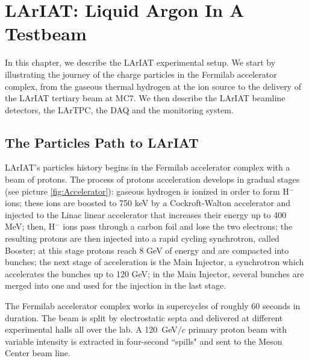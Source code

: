 
\chapter{LArIAT: Liquid Argon In A Testbeam}\label{sec:experimentDescription}
In this chapter, we describe the LArIAT experimental setup. We start by illustrating the journey of the charge particles in the Fermilab accelerator complex, from the gaseous thermal hydrogen at the ion source to the delivery of the LArIAT tertiary beam at MC7. We  then describe the LArIAT beamline detectors, the LArTPC, the DAQ and the monitoring system.

\section{The Particles Path to LArIAT}

LArIAT's particles history begins in the Fermilab accelerator complex with a beam of protons. The process of protons acceleration develops in gradual stages (see picture \ref{fig:Accelerator}): gaseous hydrogen is ionized in order to form H$^{-}$ ions; these ions are boosted to 750 keV by a Cockroft-Walton accelerator and injected to the Linac linear accelerator that increases their energy up to 400 MeV; then, H$^{-}$ ions pass through a carbon foil and lose the two electrons; the resulting protons are then injected into a rapid cycling synchrotron, called Booster; at this stage protons reach 8 GeV of energy and are compacted into bunches; the next stage of acceleration is the Main Injector, a synchrotron which accelerates the bunches up to 120 GeV; in the Main Injector, several bunches are merged into one and used for the injection in the last stage.


The Fermilab accelerator complex works in supercycles of roughly 60 seconds in duration. The beam is split by electrostatic septa and delivered at different experimental halls all over the lab. A 120~GeV$/c$ primary proton beam with variable intensity is extracted in four-second ``spills" and sent to the Meson Center beam line. 

